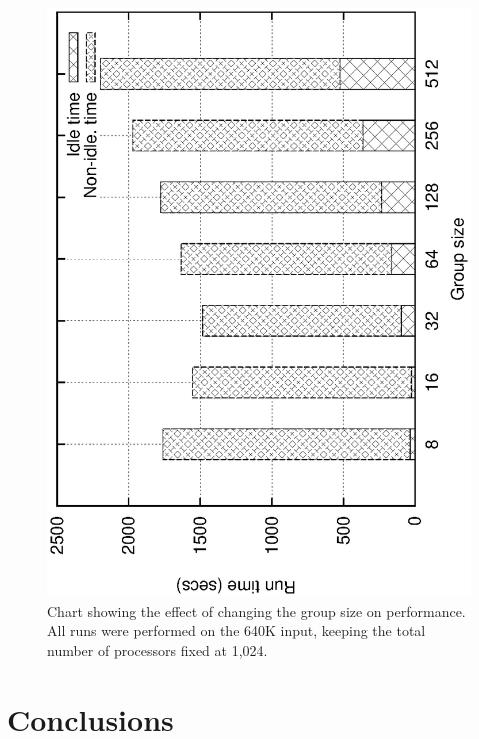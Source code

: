 \documentclass[10pt,journal,letterpaper,compsoc]{IEEEtran}
\begin{document}
\begin{figure}[h]
\centerline{
						\includegraphics[angle=-90, scale=0.5]{groupSize.eps}
}
\caption{
Chart showing the effect of changing the group size on performance. All runs were performed on the 640K input, keeping the total number of processors fixed at 1,024. 
}
\label{figGroupStudy}
\end{figure}



\section{Conclusions}
\label{secConclusions}
\end{document}
